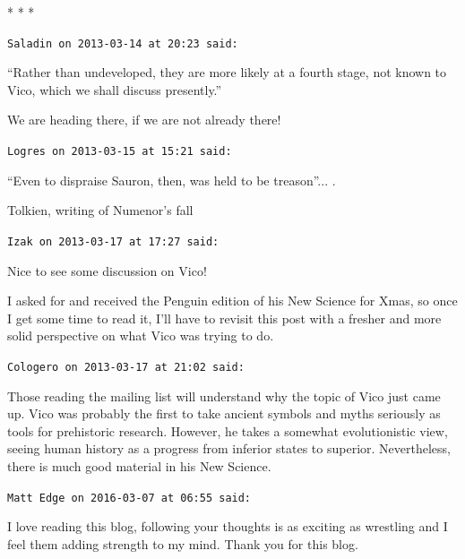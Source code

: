 
\begin{center}* * *\end{center}

\begin{footnotesize}
\begin{sffamily}
\texttt{Saladin on 2013-03-14 at 20:23 said:}

``Rather than undeveloped, they are more likely at a fourth stage, not known to Vico, which we shall discuss presently.''

We are heading there, if we are not already there!

\hfill

\texttt{Logres on 2013-03-15 at 15:21 said:}

``Even to dispraise Sauron, then, was held to be treason''... .

Tolkien, writing of Numenor's fall

\hfill

\texttt{Izak on 2013-03-17 at 17:27 said:}

Nice to see some discussion on Vico!

I asked for and received the Penguin edition of his New Science for Xmas, so once I get some time to read it, I'll have to revisit this post with a fresher and more solid perspective on what Vico was trying to do.

\hfill

\texttt{Cologero on 2013-03-17 at 21:02 said:}

Those reading the mailing list will understand why the topic of Vico just came up. Vico was probably the first to take ancient symbols and myths seriously as tools for prehistoric research. However, he takes a somewhat evolutionistic view, seeing human history as a progress from inferior states to superior. Nevertheless, there is much good material in his New Science.

\hfill

\texttt{Matt Edge on 2016-03-07 at 06:55 said:}

I love reading this blog, following your thoughts is as exciting as wrestling and I feel them adding strength to my mind. Thank you for this blog.

\hfill

\end{sffamily}
\end{footnotesize}

